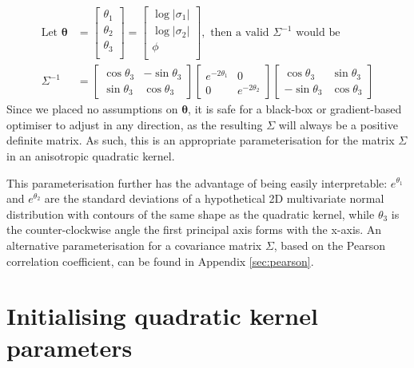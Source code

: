 \documentclass[a4paper, 12pt]{report}
\begin{document}
\begin{align}
\textrm{Let }\boldsymbol{\theta}&=\begin{bmatrix}
	\theta_1\\
	\theta_2\\
	\theta_3\\
\end{bmatrix}=\begin{bmatrix}
	\log|\sigma_1| \\
	\log|\sigma_2|\\
	\phi\\
\end{bmatrix}, \textrm{ then a valid $\Sigma^{-1}$ would be} \\
\Sigma^{-1} &= \begin{bmatrix}
	\cos \theta_3 & -\sin \theta_3 \\ \sin\theta_3 & \cos\theta_3
\end{bmatrix}\begin{bmatrix}
	 e^{-2\theta_1} & 0\\ 0 &  e^{-2\theta_2}
\end{bmatrix} \begin{bmatrix}
	\cos \theta_3 & \sin \theta_3 \\ -\sin\theta_3 & \cos\theta_3
\end{bmatrix}
\end{align}
Since we placed no assumptions on $\boldsymbol{\theta}$, it is safe for a black-box or gradient-based optimiser to adjust in any direction, as the resulting $\Sigma$ will always be a positive definite matrix. As such, this is an appropriate parameterisation for the matrix $\Sigma$ in an anisotropic quadratic kernel.

This parameterisation further has the advantage of being easily interpretable: $e^{\theta_1}$ and $e^{\theta_2}$ are the standard deviations of a hypothetical 2D multivariate normal distribution with contours of the same shape as the quadratic kernel, while $\theta_3$ is the counter-clockwise angle the first principal axis forms with the x-axis. An alternative parameterisation for a covariance matrix $\Sigma$, based on the Pearson correlation coefficient, can be found in Appendix \ref{sec:pearson}.




\newpage
\section{Initialising quadratic kernel parameters}
\end{document}
